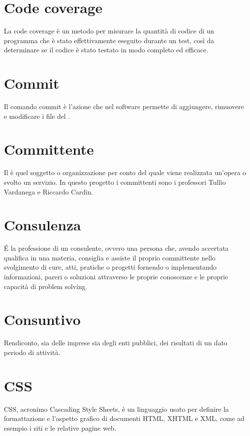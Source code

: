 \section{Code coverage}
La code coverage è un metodo per misurare la quantità di codice di un programma che è stato effettivamente eseguito durante un test, così da determinare se il codice è stato testato in modo completo ed efficace.

\section{Commit}\label{sec:Commits}
Il comando commit è l'azione che nel software  permette di aggiungere, rimuovere e modificare i file del .

\section{Committente}\label{sec:Committenti}
Il  è quel soggetto o organizzazione per conto del quale viene realizzata un'opera o svolto un servizio. In questo progetto i committenti sono i professori Tullio Vardanega e Riccardo Cardin.

\section{Consulenza}\label{sec:Consulenze}
É la professione di un consulente, ovvero una persona che, avendo accertata qualifica in una materia, consiglia e assiste il proprio committente nello svolgimento di cure, atti, pratiche o progetti fornendo o implementando informazioni, pareri o soluzioni attraverso le proprie conoscenze e le proprie capacità di problem solving.

\section{Consuntivo}\label{sec:Consuntivi}
Rendiconto, sia delle imprese sia degli enti pubblici, dei risultati di un dato periodo di attività.

\section{CSS}\label{sec:Cascading Style Sheets}
CSS, acronimo Cascading Style Sheets, è un linguaggio usato per definire la formattazione e l'aspetto grafico di documenti HTML, XHTML e XML, come ad esempio i siti e le relative pagine web.